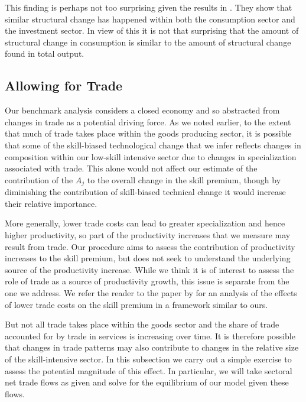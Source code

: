 \documentclass[12pt,english]{article}
\begin{document}
{\normalsize This finding is perhaps not too surprising given the results in %
\citet{HRV20}. They show that similar structural change has happened within
both the consumption sector and the investment sector. In view of this it is
not that surprising that the amount of structural change in consumption is
similar to the amount of structural change found in total output. }

\subsection{Allowing for Trade}

{\normalsize Our benchmark analysis considers a closed economy and so
abstracted from changes in trade as a potential driving force. As we noted
earlier, to the extent that much of trade takes place within the goods
producing sector, it is possible that some of the skill-biased technological
change that we infer reflects changes in composition within our low-skill
intensive sector due to changes in specialization associated with trade.
This alone would not affect our estimate of the contribution of the $A_{j}$
to the overall change in the skill premium, though by diminishing the
contribution of skill-biased technical change it would increase their
relative importance. }

{\normalsize More generally, lower trade costs can lead to greater
specialization and hence higher productivity, so part of the productivity
increases that we measure may result from trade. Our procedure aims to
assess the contribution of productivity increases to the skill premium, but
does not seek to understand the underlying source of the productivity
increase. While we think it is of interest to assess the role of trade as a
source of productivity growth, this issue is separate from the one we
address. We refer the reader to the paper by \citet{CraSot19} for an
analysis of the effects of lower trade costs on the skill premium in a
framework similar to ours. }

{\normalsize But not all trade takes place within the goods sector and the
share of trade accounted for by trade in services is increasing over time.
It is therefore possible that changes in trade patterns may also contribute
to changes in the relative size of the skill-intensive sector. In this
subsection we carry out a simple exercise to assess the potential magnitude
of this effect. In particular, we will take sectoral net trade flows as
given and solve for the equilibrium of our model given these flows. }
\end{document}
